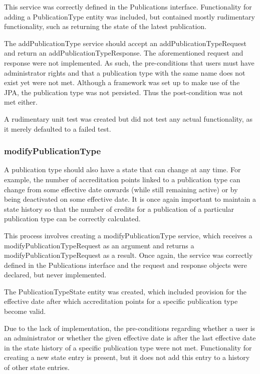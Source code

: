 \documentclass[a4paper,10pt]{article}
\begin{document}
This service was correctly defined in the Publications interface. Functionality for adding a PublicationType entity was included, but contained mostly rudimentary functionality, such as returning the state of the latest publication.

The addPublicationType service should accept an addPublicationTypeRequest and return an addPublicationTypeResponse. The aforementioned request and response were not implemented. As such, the pre-conditions that users must have administrator rights and that a publication type with the same name does not exist yet were not met. Although a framework was set up to make use of the JPA, the publication type was not persisted. Thus the post-condition was not met either.

A rudimentary unit test was created but did not test any actual functionality, as it merely defaulted to a failed test.

\subsubsection{modifyPublicationType}
A publication type should also have a state that can change at any time. For example, the number of accreditation points linked to a publication type can change from some effective date onwards (while still remaining active) or by being deactivated on some effective date. It is once again important to maintain a state history so that the number of credits for a publication of a particular publication type can be correctly calculated.

This process involves creating a modifyPublicationType service, which receives a modifyPublicationTypeRequest as an argument and returns a modifyPublicationTypeRequest as a result. Once again, the service was correctly defined in the Publications interface and the request and response objects were declared, but never implemented.

The PublicationTypeState entity was created, which included provision for the effective date after which accreditation points for a specific publication type become valid.

Due to the lack of implementation, the pre-conditions regarding whether a user is an administrator or whether the given effective date is after the last effective date in the state history of a specific publication type were not met. Functionality for creating a new state entry is present, but it does not add this entry to a history of other state entries.
\end{document}
